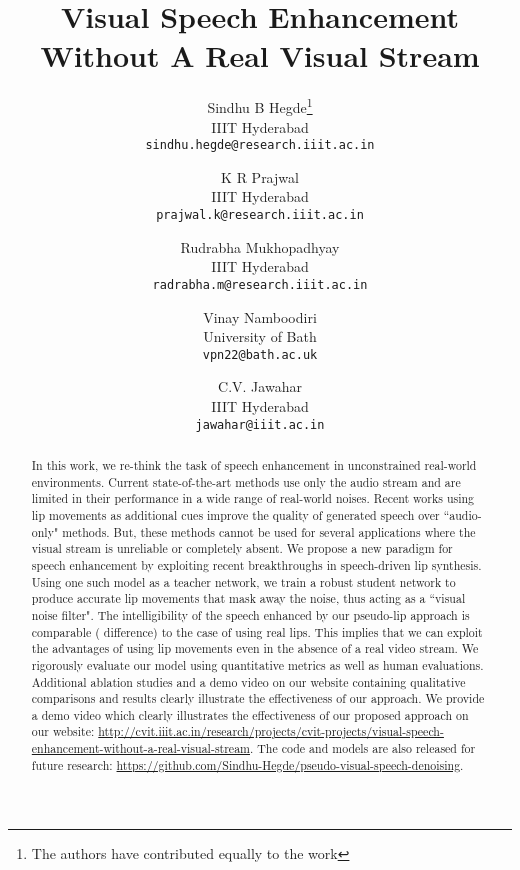\documentclass[10pt,twocolumn,letterpaper]{article}
\begin{document}
\title{Visual Speech Enhancement Without A Real Visual Stream}

\author{Sindhu B Hegde\thanks{The authors have contributed equally to the work}\\
IIIT Hyderabad\\
{\tt\small sindhu.hegde@research.iiit.ac.in}
\and
K R Prajwal\footnotemark[1]\\
IIIT Hyderabad\\
{\tt\small prajwal.k@research.iiit.ac.in}

\and
Rudrabha Mukhopadhyay\footnotemark[1]\\
IIIT Hyderabad\\
{\tt\small radrabha.m@research.iiit.ac.in}

\and
Vinay Namboodiri\\
University of Bath\\
{\tt\small vpn22@bath.ac.uk}

\and
C.V. Jawahar\\
IIIT Hyderabad\\
{\tt\small jawahar@iiit.ac.in}
}

\maketitle
\begin{abstract}
In this work, we re-think the task of speech enhancement in unconstrained real-world environments. Current state-of-the-art methods use only the audio stream and are limited in their performance in a wide range of real-world noises. Recent works using lip movements as additional cues improve the quality of generated speech over ``audio-only" methods. But, these methods cannot be used for several applications where the visual stream is unreliable or completely absent. We propose a new paradigm for speech enhancement by exploiting recent breakthroughs in speech-driven lip synthesis. Using one such model as a teacher network, we train a robust student network to produce accurate lip movements that mask away the noise, thus acting as a ``visual noise filter". The intelligibility of the speech enhanced by our pseudo-lip approach is comparable ( difference) to the case of using real lips. This implies that we can exploit the advantages of using lip movements even in the absence of a real video stream. We rigorously evaluate our model using quantitative metrics as well as human evaluations. Additional ablation studies and a demo video on our website containing qualitative comparisons and results clearly illustrate the effectiveness of our approach. We provide a demo video which clearly illustrates the effectiveness of our proposed approach on our website: \scriptsize{\url{http://cvit.iiit.ac.in/research/projects/cvit-projects/visual-speech-enhancement-without-a-real-visual-stream}}. 
\normalsize{The code and models are also released for future research:} \scriptsize{\url{https://github.com/Sindhu-Hegde/pseudo-visual-speech-denoising}}.
\end{abstract}
\end{document}
